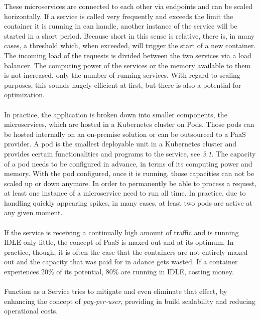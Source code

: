 \documentclass[a4paper,twoside,11pt, pagesize]{scrartcl}
\begin{document}
\begin{spacing}{1.2}
These microservices are connected to each other via endpoints and can be scaled horizontally. If a service is called very frequently and exceeds the limit the container it is running in can handle, another instance of the service will be started in a short period. Because short in this sense is relative, there is, in many cases, a threshold which, when exceeded, will trigger the start of a new container. The incoming load of the requests is divided between the two services via a load balancer. The computing power of the services or the memory available to them is not increased, only the number of running services. With regard to scaling purposes, this sounds hugely efficient at first, but there is also a potential for optimization.\\\\
In practice, the application is broken down into smaller components, the microservices, which are hosted in a Kubernetes cluster on Pods. Those pods can be hosted internally on an on-premise solution or can be outsourced to a PaaS provider. A pod is the smallest deployable unit in a Kubernetes cluster and provides certain functionalities and programs to the service, see \textit{3.1}. The capacity of a pod needs to be configured in advance, in terms of its computing power and memory. With the pod configured, once it is running, those capacities can not be scaled up or down anymore. In order to permanently be able to process a request, at least one instance of a microservice need to run all time. In practice, due to handling quickly appearing spikes, in many cases, at least two pods are active at any given moment. \\\\
If the service is receiving a continually high amount of traffic and is running IDLE only little, the concept of PaaS is maxed out and at its optimum. In practice, though, it is often the case that the containers are not entirely maxed out and the capacity that was paid for in adance gets wasted. If a container experiences 20\% of its potential, 80\% are running in IDLE, costing money. \\\\ Function as a Service tries to mitigate and even eliminate that effect, by enhancing the concept of \textit{pay-per-user}, providing in build scalability and reducing operational costs. 

\end{spacing}
\end{document}
